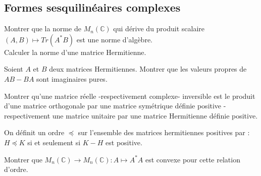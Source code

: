 \subsection{Formes sesquilin\'eaires complexes}

\begin{exer}
Montrer que la norme de $M_n (\mathbb{C})$ qui dérive du produit scalaire $(A,B) \mapsto Tr(A^{\ast} B)$ %
est une norme d'algèbre.\\
Calculer la norme d'une matrice Hermitienne.
\end{exer}

\begin{exer}
Soient $A$ et $B$ deux matrices Hermitiennes. Montrer que les valeurs propres de $AB - BA$ sont imaginaires pures.
\end{exer}

\begin{exer}
Montrer qu'une matrice réelle -respectivement complexe- inversible est le produit d'une matrice orthogonale %
par une matrice symétrique définie positive -respectivement une matrice unitaire par une matrice Hermitienne définie positive.
\end{exer}

\begin{exer}
On définit un ordre $\preceq$ sur l'ensemble des matrices hermitiennes positives par : $H \preceq K$ si et seulement si $K - H$ est positive.

Montrer que $M_n(\mathbb{C}) \rightarrow M_n(\mathbb{C}) : A \mapsto A^{\ast} A$ est convexe pour cette relation d'ordre.
\end{exer}